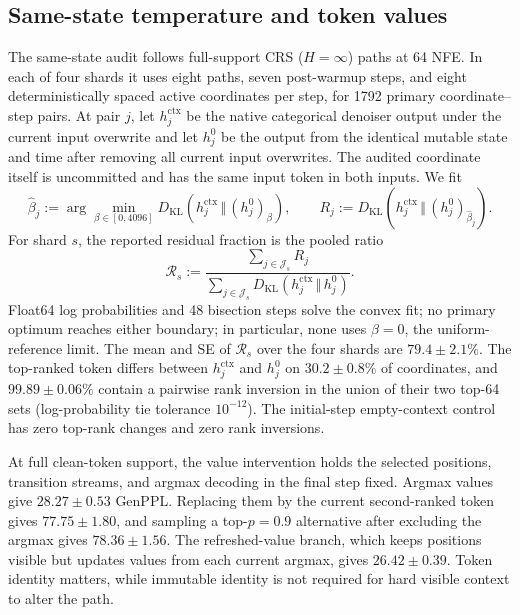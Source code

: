 \documentclass{article}
\newcommand{\KL}{D_{\mathrm{KL}}}
\newcommand{\kldiv}{\,\Vert\,}
\newcommand{\1}{\mathbf 1}
\newcommand{\CRS}{\textsc{CRS}}
\theoremstyle{definition}
\begin{document}
\subsection{Same-state temperature and token values}

The same-state audit follows full-support \CRS{} ($H=\infty$) paths at 64 NFE. In
each of four shards it uses eight paths, seven post-warmup steps, and eight
deterministically spaced active coordinates per step, for 1792 primary
coordinate--step pairs. At pair $j$, let $h_j^{\mathrm{ctx}}$ be the native
categorical denoiser output under the current input overwrite and let $h_j^0$ be the
output from the identical mutable state and time after removing all current
input overwrites. The audited coordinate itself is uncommitted and
has the same input token in both inputs. We fit
\begin{equation}
 \widehat\beta_j
 :=\arg\min_{\beta\in[0,4096]}
 \KL\!\left(h_j^{\mathrm{ctx}}\kldiv(h_j^0)_\beta\right),
 \qquad
 R_j:=\KL\!\left(h_j^{\mathrm{ctx}}
 \kldiv(h_j^0)_{\widehat\beta_j}\right).
 \label{eq:same-state-fit-app}
\end{equation}
For shard $s$, the reported residual fraction is the pooled ratio
\begin{equation}
 \mathcal R_s
 :=\frac{\sum_{j\in\mathcal J_s}R_j}
 {\sum_{j\in\mathcal J_s}
 \KL(h_j^{\mathrm{ctx}}\kldiv h_j^0)}.
 \label{eq:same-state-pooled-residual-app}
\end{equation}
Float64 log probabilities and 48 bisection steps solve the convex fit; no
primary optimum reaches either boundary; in particular, none uses
$\beta=0$, the uniform-reference limit.
The mean and SE of $\mathcal R_s$ over the four shards are
$79.4\pm2.1\%$. The top-ranked token differs between
$h_j^{\mathrm{ctx}}$ and $h_j^0$ on $30.2\pm0.8\%$ of coordinates, and
$99.89\pm0.06\%$ contain a pairwise rank inversion in the union of their two
top-64 sets (log-probability tie tolerance $10^{-12}$). The initial-step
empty-context control has zero top-rank changes and zero rank inversions.

At full clean-token support, the value intervention holds the selected positions,
transition streams, and argmax decoding in the final step fixed. Argmax values give
$28.27\pm0.53$ GenPPL. Replacing them by the current second-ranked token gives
$77.75\pm1.80$, and sampling a top-$p=0.9$ alternative after excluding the
argmax gives $78.36\pm1.56$. The refreshed-value branch, which keeps positions
visible but updates values from each current argmax, gives
$26.42\pm0.39$. Token identity matters, while immutable identity is not
required for hard visible context to alter the path.
\end{document}
